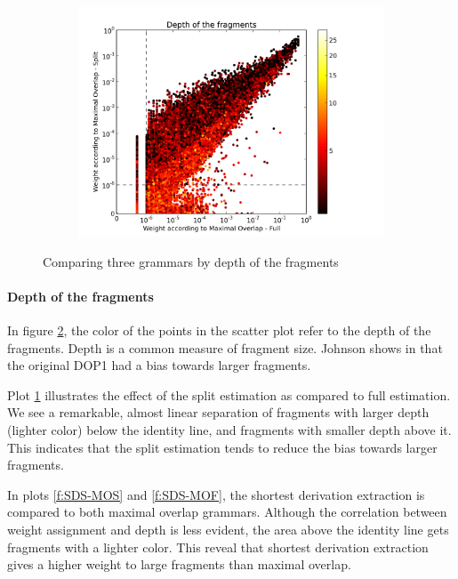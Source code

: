 \begin{figure}
\begin{subfigure}{0.32\textwidth}
\includegraphics[width=\linewidth,trim=0.5cm 0cm 2.5cm 0.5cm, clip=true]{../data/plots/2.png}
\caption{}
\label{f:MOS-MOF}
\end{subfigure}

\caption{Comparing three grammars by depth of the fragments}
\label{f:depth3}
\end{figure}

\paragraph{Depth of the fragments}
In figure \ref{f:depth3}, the color of the points in the scatter plot refer to the depth of the fragments. Depth is a common measure of fragment size. Johnson shows in  that the original DOP1 had a bias towards larger fragments. 

Plot \ref{f:MOS-MOF} illustrates the effect of the split estimation as compared to full estimation. We see a remarkable, almost linear separation of fragments with larger depth (lighter color) below the identity line, and fragments with smaller depth above it. This indicates that the split estimation tends to reduce the bias towards larger fragments.

In plots \ref{f:SDS-MOS} and \ref{f:SDS-MOF}, the shortest derivation extraction is compared to both maximal overlap grammars. Although the correlation between weight assignment and depth is less evident, the area above the identity line gets fragments with a lighter color. This reveal that shortest derivation extraction gives a higher weight to large fragments than maximal overlap. 


